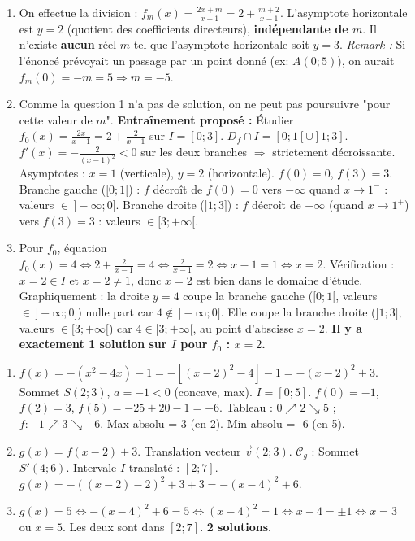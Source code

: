 \documentclass[11pt]{article}
\begin{document}
\begin{corrige}[Entraînement 1]
\begin{enumerate}
    \item On effectue la division : $f_m(x) = \frac{2x+m}{x-1} = 2 + \frac{m+2}{x-1}$.
    L'asymptote horizontale est $y = 2$ (quotient des coefficients directeurs), \textbf{indépendante de $m$}.
    Il n'existe \textbf{aucun} réel $m$ tel que l'asymptote horizontale soit $y=3$.
    \emph{Remark :} Si l'énoncé prévoyait un passage par un point donné (ex: $A(0;5)$), on aurait $f_m(0)=-m=5 \Rightarrow m=-5$.
    \item Comme la question 1 n'a pas de solution, on ne peut pas poursuivre "pour cette valeur de $m$".
    \textbf{Entraînement proposé :} Étudier $f_0(x) = \frac{2x}{x-1} = 2 + \frac{2}{x-1}$ sur $I=[0;3]$.
    $D_f \cap I = [0;1[ \cup ]1;3]$. $f'(x) = -\frac{2}{(x-1)^2} < 0$ sur les deux branches $\Rightarrow$ strictement décroissante.
    Asymptotes : $x=1$ (verticale), $y=2$ (horizontale).
    $f(0)=0$, $f(3)=3$.
    Branche gauche ($[0;1[$) : $f$ décroît de $f(0)=0$ vers $-\infty$ quand $x\to 1^-$ : valeurs $\in\,]-\infty ; 0]$.
    Branche droite ($]1;3]$) : $f$ décroît de $+\infty$ (quand $x\to 1^+$) vers $f(3)=3$ : valeurs $\in [3 ; +\infty[$.
    \item Pour $f_0$, équation $f_0(x)=4 \Leftrightarrow 2 + \frac{2}{x-1}=4 \Leftrightarrow \frac{2}{x-1}=2 \Leftrightarrow x-1=1 \Leftrightarrow x=2$.
    Vérification : $x=2 \in I$ et $x=2\neq 1$, donc $x=2$ est bien dans le domaine d'étude.
    Graphiquement : la droite $y=4$ coupe la branche gauche ($[0;1[$, valeurs $\in\,]-\infty;0]$) nulle part car $4\notin\,]-\infty;0]$. Elle coupe la branche droite ($]1;3]$, valeurs $\in [3;+\infty[$) car $4\in[3;+\infty[$, au point d'abscisse $x=2$.
    \textbf{Il y a exactement 1 solution sur $I$ pour $f_0$ : $x=2$.}
\end{enumerate}
\end{corrige}

\begin{corrige}[Entraînement 2]
\begin{enumerate}
    \item $f(x) = -(x^2 - 4x) - 1 = -[(x-2)^2 - 4] - 1 = -(x-2)^2 + 3$. Sommet $S(2;3)$, $a=-1<0$ (concave, max).
    $I=[0;5]$. $f(0)=-1$, $f(2)=3$, $f(5)=-25+20-1=-6$.
    Tableau : $0 \nearrow 2 \searrow 5$ ; $f: -1 \nearrow 3 \searrow -6$.
    Max absolu = 3 (en 2). Min absolu = -6 (en 5).
    \item $g(x) = f(x-2) + 3$. Translation vecteur $\vec{v}(2;3)$.
    $\mathcal{C}_g$ : Sommet $S'(4;6)$. Intervale $I$ translaté : $[2;7]$.
    $g(x) = -((x-2)-2)^2 + 3 + 3 = -(x-4)^2 + 6$.
    \item $g(x)=5 \Leftrightarrow -(x-4)^2 + 6 = 5 \Leftrightarrow (x-4)^2 = 1 \Leftrightarrow x-4 = \pm 1 \Leftrightarrow x=3$ ou $x=5$.
    Les deux sont dans $[2;7]$. \textbf{2 solutions}.
\end{enumerate}
\end{corrige}
\end{document}
